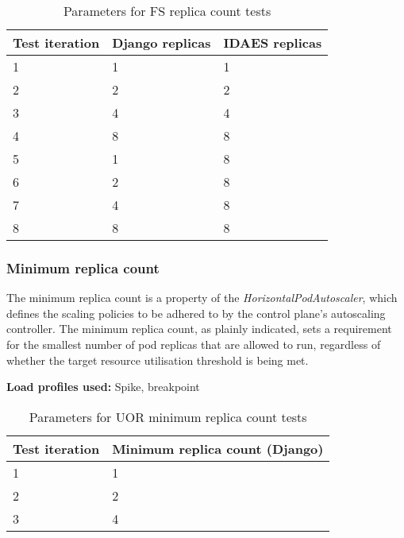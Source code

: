 \begin{table}[h]
    \centering
    \begin{tabularx}{\textwidth}{|X|X|X|}
        \hline
        \textbf{Test iteration} & \textbf{Django replicas} & \textbf{IDAES replicas}  \\ \hline
        1 & 1 & 1 \\ \hline
        2 & 2 & 2 \\ \hline
        3 & 4 & 4 \\ \hline
        4 & 8 & 8 \\ \hline
        5 & 1 & 8 \\ \hline
        6 & 2 & 8 \\ \hline
        7 & 4 & 8 \\ \hline
        8 & 8 & 8 \\ \hline
    \end{tabularx}
    \caption{Parameters for FS replica count tests}
    \label{table:test-replica-count-fs}
\end{table}

\subsubsection{Minimum replica count}

The minimum replica count is a property of the \textit{HorizontalPodAutoscaler}, which defines the scaling policies to be adhered to by the control plane's autoscaling controller. The minimum replica count, as plainly indicated, sets a requirement for the smallest number of pod replicas that are allowed to run, regardless of whether the target resource utilisation threshold is being met.

\noindent\textbf{Load profiles used:} Spike, breakpoint

\begin{table}[h]
    \centering
    \begin{tabularx}{\textwidth}{|X|X|}
        \hline
        \textbf{Test iteration} & \textbf{Minimum replica count (Django)}  \\ \hline
        1 & 1 \\ \hline
        2 & 2 \\ \hline
        3 & 4 \\ \hline
    \end{tabularx}
    \caption{Parameters for UOR minimum replica count tests}
    \label{table:test-min-replica-count-uor}
\end{table}

